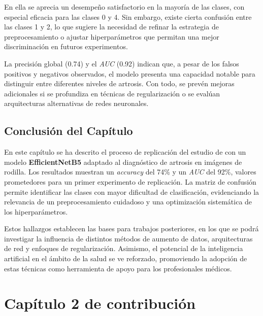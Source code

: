 \documentclass[11pt,spanish,listoffigures,listoftables]{tfgetsinf}
\begin{document}
En ella se aprecia un desempeño satisfactorio en la mayoría de las clases, con especial eficacia para las clases 0 y 4. Sin embargo, existe cierta confusión entre las clases 1 y 2, lo que sugiere la necesidad de refinar la estrategia de preprocesamiento o ajustar hiperparámetros que permitan una mejor discriminación en futuros experimentos.

La precisión global (0.74) y el \textit{AUC} (0.92) indican que, a pesar de los falsos positivos y negativos observados, el modelo presenta una capacidad notable para distinguir entre diferentes niveles de artrosis. Con todo, se prevén mejoras adicionales si se profundiza en técnicas de regularización o se evalúan arquitecturas alternativas de redes neuronales.

\section{Conclusión del Capítulo}
En este capítulo se ha descrito el proceso de replicación del estudio de \cite{10863523} con un modelo \textbf{EfficientNetB5} adaptado al diagnóstico de artrosis en imágenes de rodilla. Los resultados muestran un \textit{accuracy} del 74\% y un \textit{AUC} del 92\%, valores prometedores para un primer experimento de replicación. La matriz de confusión permite identificar las clases con mayor dificultad de clasificación, evidenciando la relevancia de un preprocesamiento cuidadoso y una optimización sistemática de los hiperparámetros.

Estos hallazgos establecen las bases para trabajos posteriores, en los que se podrá investigar la influencia de distintos métodos de aumento de datos, arquitecturas de red y enfoques de regularización. Asimismo, el potencial de la inteligencia artificial en el ámbito de la salud se ve reforzado, promoviendo la adopción de estas técnicas como herramienta de apoyo para los profesionales médicos.
\chapter{Capítulo 2 de contribución}   %

\end{document}
